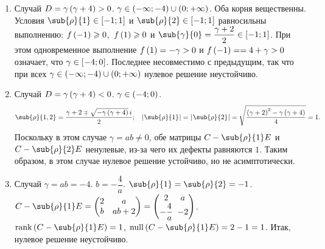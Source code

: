 \documentclass[a5paper,10pt]{article}
\begin{document}
\begin{enumerate}
    \item Случай $D = \gamma \left(\hspace{0.01em}\gamma + 4\hspace{0.01em}\right) > 0$.
    $\gamma \in \left(\hspace{0.01em}-\infty; -4\hspace{0.01em}\right) \cup \left(\hspace{0.01em}0; +\infty\hspace{0.01em}\right)$. Оба корня вещественны. \linebreak
    Условия $\sub{\rho}{1} \in \rbr{-1; 1}$ и $\sub{\rho}{2} \in \rbr{-1; 1}$
    равносильны выполнению: $f\left(\hspace{0.01em}-1\hspace{0.01em}\right) \geqslant 0$,\, $f\left(\hspace{0.01em}1\hspace{0.01em}\right) \geqslant 0$ и 
    $\sub{\gamma}{0} = \dfrac {\gamma + 2} {2} \in \rbr{-1; 1}$.
    При этом одновременное выполнение $f\left(\hspace{0.01em}1\hspace{0.01em}\right) = -\gamma > 0$ 
    и $f\br{-1} = \linebreak = 4 + \gamma > 0$ означает, что $\gamma \in \left[\hspace{0.03em}-4; 0\hspace{0.03em}\right]$.
    Последнее несовместимо с предыдущим, так что при всех 
    $\gamma \in \left(\hspace{0.01em}-\infty; -4\hspace{0.01em}\right) \cup \left(\hspace{0.01em}0; +\infty\hspace{0.01em}\right)$ нулевое решение неустойчиво.
    
    \item Случай $D = \gamma \left(\hspace{0.01em}\gamma + 4\hspace{0.01em}\right) < 0$. $\gamma \in \left(\hspace{0.01em}-4; 0\hspace{0.01em}\right)$. 
    \begin{align*}
        \sub{\rho}{1,2} = \dfrac {\gamma + 2 \mp \sqrt{-\gamma \br{\gamma + 4}}\,i} {2};
        && \vbr{\sub{\rho}{1}} = \vbr{\sub{\rho}{2}} =
        \textstyle\sqrt{\dfrac {\br{\gamma + 2}^2 - \gamma \br{\gamma + 4}} {4}} = 1.
    \end{align*}
    Поскольку в этом случае $\gamma = ab \ne 0$, обе матрицы
    $C - \sub{\rho}{1} E$ и $C - \sub{\rho}{2} E$ ненулевые,
    из-за чего их дефекты равняются $1$.
    Таким образом, в этом случае нулевое решение устойчиво, но не асимптотически.
    
    \item Случай $\gamma = ab = -4$. $b = -\dfrac {4} {a}$. $\sub{\rho}{1} = \sub{\rho}{2} = -1$. 
    $C - \sub{\rho}{1} E 
        = \begin{pmatrix} 2 & a \\ b & ab + 2 \end{pmatrix} 
        = \begin{pmatrix} 2 & \negthickspace\! a 
            \\ -\dfrac {4} {a} & \negthickspace\! -2 \end{pmatrix} $. 
    $\rank\br{C - \sub{\rho}{1} E} = 1$,
    $\nullity\br{C - \sub{\rho}{1} E} = 2 - 1 = 1$.
    Итак, нулевое решение неустойчиво.
    

\end{enumerate}
\end{document}
